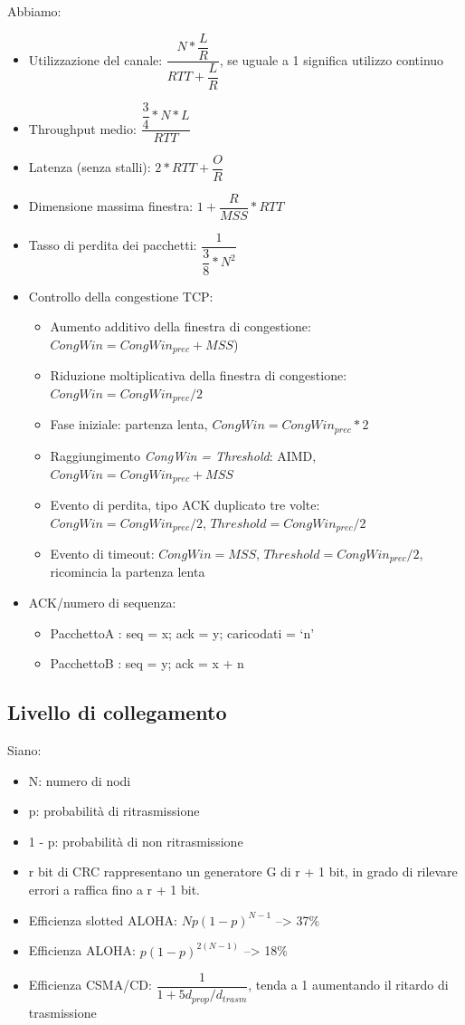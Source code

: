 \documentclass[11pt,a4paper]{article}
\begin{document}
Abbiamo:
\begin{itemize}
	\item Utilizzazione del canale: $\dfrac{N * \dfrac{L}{R}}{RTT + \dfrac{L}{R}}$, se uguale a 1 significa utilizzo continuo
	\item Throughput medio: $\dfrac{\dfrac{3}{4} * N * L}{RTT}$
	\item Latenza (senza stalli): $2 * RTT + \dfrac{O}{R}$
	\item Dimensione massima finestra: $1 + \dfrac{R}{MSS} * RTT$
	\item Tasso di perdita dei pacchetti: $\dfrac{1}{\dfrac{3}{8} * N^{2}}$
	\item Controllo della congestione TCP:
	\begin{itemize}
		\item Aumento additivo della finestra di congestione: $CongWin = CongWin_{prec} + MSS$)
		\item Riduzione moltiplicativa della finestra di congestione: $CongWin = CongWin_{prec}/2$
		\item Fase iniziale: partenza lenta, $CongWin = CongWin_{prec}*2$
		\item Raggiungimento \emph{CongWin = Threshold}: AIMD, $CongWin = CongWin_{prec} + MSS$
		\item Evento di perdita, tipo ACK duplicato tre volte: $CongWin = CongWin_{prec}/2$, $Threshold = CongWin_{prec}/2$
		\item Evento di timeout: $CongWin = MSS$, $Threshold = CongWin_{prec}/2$, ricomincia la partenza lenta
	\end{itemize}
	\item ACK/numero di sequenza:
	\begin{itemize}
		\item PacchettoA : seq = x; ack = y; caricodati = ‘n'
		\item PacchettoB : seq = y; ack = x + n
	\end{itemize}
\end{itemize}

\subsection{Livello di collegamento}
Siano:
\begin{itemize}
	\item N: numero di nodi
	\item p: probabilità di ritrasmissione
	\item 1 - p: probabilità di non ritrasmissione
\end{itemize}
\begin{itemize}
	\item r bit di CRC rappresentano un generatore G di r + 1 bit, in grado di rilevare errori a raffica fino a r + 1 bit.
	\item Efficienza slotted ALOHA: $Np(1 - p)^{N - 1}$ --> 37\%
	\item Efficienza ALOHA: $p(1 - p)^{2(N - 1)}$ --> 18\%
	\item Efficienza CSMA/CD: $\dfrac{1}{1 + 5d_{prop}/d_{trasm}}$, tenda a 1 aumentando il ritardo di trasmissione
\end{itemize}
\end{document}
